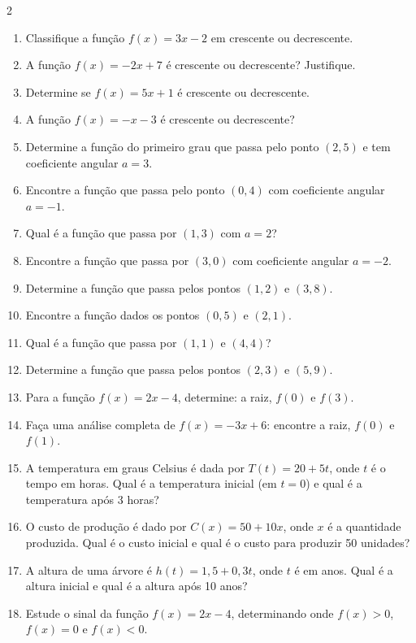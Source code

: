 \documentclass[11pt]{article}
\begin{document}
\begin{multicols}{2}
\begin{enumerate}[leftmargin=*]
\item Classifique a função $f(x) = 3x - 2$ em crescente ou decrescente.

\item A função $f(x) = -2x + 7$ é crescente ou decrescente? Justifique.

\item Determine se $f(x) = 5x + 1$ é crescente ou decrescente.

\item A função $f(x) = -x - 3$ é crescente ou decrescente?

\item Determine a função do primeiro grau que passa pelo ponto $(2, 5)$ e tem coeficiente angular $a = 3$.

\item Encontre a função que passa pelo ponto $(0, 4)$ com coeficiente angular $a = -1$.

\item Qual é a função que passa por $(1, 3)$ com $a = 2$?

\item Encontre a função que passa por $(3, 0)$ com coeficiente angular $a = -2$.

\item Determine a função que passa pelos pontos $(1, 2)$ e $(3, 8)$.

\item Encontre a função dados os pontos $(0, 5)$ e $(2, 1)$.

\item Qual é a função que passa por $(1, 1)$ e $(4, 4)$?

\item Determine a função que passa pelos pontos $(2, 3)$ e $(5, 9)$.

\item Para a função $f(x) = 2x - 4$, determine: a raiz, $f(0)$ e $f(3)$.

\item Faça uma análise completa de $f(x) = -3x + 6$: encontre a raiz, $f(0)$ e $f(1)$.

\item A temperatura em graus Celsius é dada por $T(t) = 20 + 5t$, onde $t$ é o tempo em horas. Qual é a temperatura inicial (em $t = 0$) e qual é a temperatura após 3 horas?

\item O custo de produção é dado por $C(x) = 50 + 10x$, onde $x$ é a quantidade produzida. Qual é o custo inicial e qual é o custo para produzir 50 unidades?

\item A altura de uma árvore é $h(t) = 1,5 + 0,3t$, onde $t$ é em anos. Qual é a altura inicial e qual é a altura após 10 anos?

\item Estude o sinal da função $f(x) = 2x - 4$, determinando onde $f(x) > 0$, $f(x) = 0$ e $f(x) < 0$.

\end{enumerate}

\end{multicols}
\end{document}
